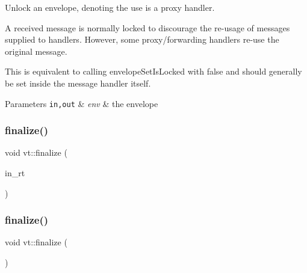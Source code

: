 Unlock an envelope, denoting the use is a proxy handler. 

A received message is normally locked to discourage the re-\/usage of messages supplied to handlers. However, some proxy/forwarding handlers re-\/use the original message.

This is equivalent to calling {\ttfamily envelope\+Set\+Is\+Locked} with false and should generally be set inside the message handler itself.


\begin{DoxyParams}[1]{Parameters}
\mbox{\tt in,out}  & {\em env} & the envelope \\
\hline
\end{DoxyParams}
\mbox{\label{namespacevt_a540d90dbd6e97b69f1dcbc9ee9314cff}} 
\subsubsection{\texorpdfstring{finalize()}{finalize()}\hspace{0.1cm}{\footnotesize\ttfamily [1/2]}}
{\footnotesize\ttfamily void vt\+::finalize (\begin{DoxyParamCaption}\item[{\hyperlink{namespacevt_a0ce60e0299d8fa32223b3b9ffa0af466}{Runtime\+Ptr\+Type}}]{in\+\_\+rt }\end{DoxyParamCaption})}

\mbox{\label{namespacevt_ae8e663109f635cbeca94c39b89b4683c}} 
\subsubsection{\texorpdfstring{finalize()}{finalize()}\hspace{0.1cm}{\footnotesize\ttfamily [2/2]}}
{\footnotesize\ttfamily void vt\+::finalize (\begin{DoxyParamCaption}{ }\end{DoxyParamCaption})}

\mbox{\label{namespacevt_aaa266774ea8339c58be0202b00fafa62}} 

